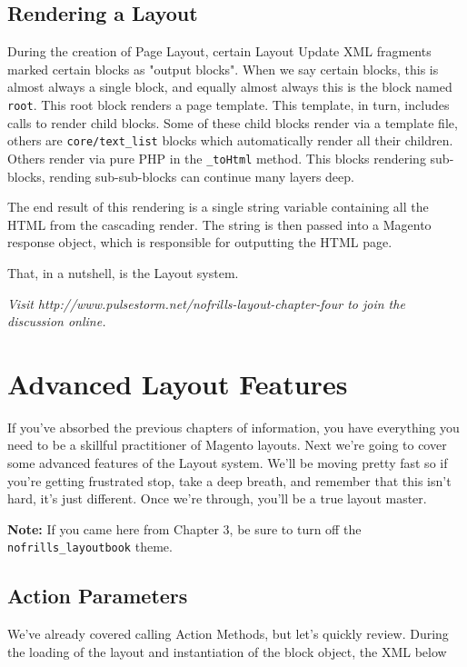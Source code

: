 \documentclass[oneside]{book}
\begin{document}
\section{Rendering a Layout}

During the creation of Page Layout, certain Layout Update XML fragments marked certain blocks as "output blocks".  When we say certain blocks, this is almost always a single block, and equally almost always this is the block named \footnotesize\texttt{root}\normalsize.  This root block renders a page template.  This template, in turn, includes calls to render child blocks.  Some of these child blocks render via a template file, others are \footnotesize\texttt{core/text\_list} \normalsize  blocks which automatically render all their children.  Others render via pure PHP in the \footnotesize\texttt{\_toHtml} \normalsize  method.  This blocks rendering sub-blocks, rending sub-sub-blocks can continue many layers deep.

The end result of this  rendering is a single string variable containing all the HTML from the cascading render.  The string is then passed into a Magento response object, which is responsible for outputting the HTML page. 

That, in a nutshell, is the Layout system.

\emph{Visit http://www.pulsestorm.net/nofrills-layout-chapter-four to join the discussion online.}
\chapter{Advanced Layout Features}
If you've absorbed the previous chapters of information, you have everything you need to be a skillful practitioner of Magento layouts.  Next we're going to cover some advanced features of the Layout system.  We'll be moving pretty fast so if you're getting frustrated stop, take a deep breath, and remember that this isn't hard, it's just different.  Once we're through, you'll be a true layout master.

\textbf{Note:} If you came here from Chapter 3, be sure to turn off the \footnotesize\texttt{nofrills\_layoutbook} \normalsize  theme.

\section{Action Parameters}

We've already covered calling Action Methods, but let's quickly review. During the loading of the layout and instantiation of the block object, the XML below
\end{document}
